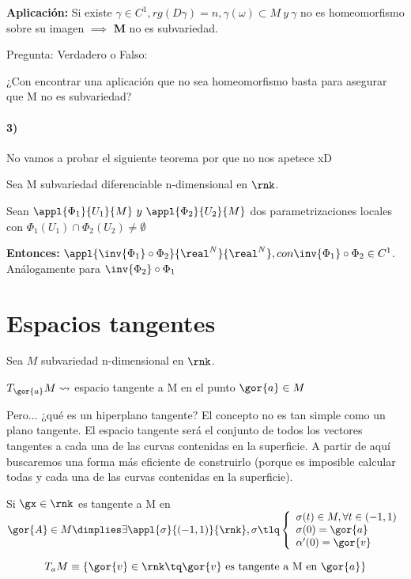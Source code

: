 \textbf{Aplicación:} Si existe $\gamma \in C^1, rg(D\gamma) = n, \gamma(\omega)\subset M \ y \ \gamma
$ no es homeomorfismo sobre su imagen $\implies$ \textbf{M} no es subvariedad.

Pregunta: Verdadero o Falso:

¿Con encontrar una aplicación que no sea homeomorfismo basta para asegurar que M no es subvariedad?

\paragraph{3)\\}

No vamos a probar el siguiente teorema por que no nos apetece xD

\begin{theorem}
Sea M subvariedad diferenciable n-dimensional en $\rnk$.

Sean $\appl{\Phi_1}{U_1}{M} \ y \ \appl{\Phi_2}{U_2}{M}$ dos parametrizaciones locales con $\Phi_1(U_1)\cap \Phi_2(U_2)\neq \emptyset$

\textbf{Entonces:} $\appl{\inv{\Phi_1}\circ \Phi_2}{\real^N}{\real^N}, con \inv{\Phi_1}\circ \Phi_2 \in C^1$. Análogamente para $\inv{\Phi_2}\circ\Phi_1$
\end{theorem}

\section{Espacios tangentes}

Sea $M$ subvariedad n-dimensional en $\rnk$.

$T_{\gor{a}}M \leadsto$ espacio tangente a M en el punto $\gor{a}\in M$

Pero... ¿qué es un hiperplano tangente? El concepto no es tan simple como un plano tangente. El espacio tangente será el conjunto de todos los vectores tangentes a cada una de las curvas contenidas en la superficie. A partir de aquí buscaremos una forma más eficiente de construirlo (porque es imposible calcular todas y cada una de las curvas contenidas en la superficie).

\begin{defn}
Si $\gx \in \rnk$ es tangente a M en $\gor{A} \in M \dimplies \exists \appl{\sigma}{(-1,1)}{\rnk}, \sigma \tlq \left\{\begin{array}{lc}
\sigma(t) \in M, \forall t\in (-1,1)\\
\sigma(0) = \gor{a}\\
\alpha'(0) = \gor{v}
\end{array}\right.$
\end{defn}
\begin{defn}
\[T_aM \equiv \{ \gor{v} \in \rnk \tq \gor{v} \text{ es tangente a M en }\gor{a}\}\]
\end{defn}


